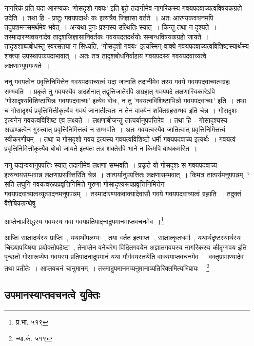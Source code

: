 		नागरिकं प्रति यदा आरण्यकः 'गोसदृशो गवयः' इति ब्रूते तदानीमेव नागरिकस्य गवयपदवाच्यत्वविषयकग्रहो उदेति~। तथा हि~- प्रष्टुः गवयपदार्थः कः इत्यत्रैव जिज्ञासा वर्तते~। अतः आरण्यकवचनमपि तदुपशमनसमर्थमेव भवेत्~। अन्यथा पुनः प्रश्नस्य उत्थितिः स्यात्~। किन्तु तथा न दृश्यते~। तस्मादारण्यवचनादेव तादृशजिज्ञासानिवर्तकः गवयपदतदर्थयोः सम्बन्धविषयकग्रहो जायते~। तादृशशाब्दबोधस्तु स्वरसतया न सिध्यति, 'गोसदृशो गवयः' इत्यस्मिन् वाक्ये गवयपदवाच्यत्वविशिष्टस्यार्थस्य शक्त्या उपस्थापकपदाभावात्~। अतः तत्र तादृशबोधनिर्वाहाय गवयपदस्य गवयपदवाच्यत्वे लक्षणाभ्युपगम्यते~। 

		ननु गवयत्वेन प्रवृत्तिनिमित्तेन गवयपदवाच्यत्वं यदा जानाति तदानीमेव तस्य गवये गवयपदवाच्यत्वग्रहः सम्भवति~। प्रकृते तु गवयस्यैव अदर्शनात् तद्वृत्तिजातेरपि अग्रहात् गवयपदे लक्षणास्विकारेऽपि 'गोसादृश्यविशिष्टाभिन्नः गवयपदवाच्यः' इत्येव बोधः, न तु 'गवयत्वविशिष्टाभिन्नो गवयपदवाच्यः' इति~। तथा च गोसादृश्यं प्रवृत्तिमित्तीकृत्यैव गवयं जानातीत्यतः न तेन वाक्येन शक्तिग्रहसम्भव इति चेन्न~।  गोसदृशः इत्यनेन गवयत्वविशिष्ट एव लक्ष्यते~। लक्षणाबीजन्तु तात्पर्यानुपपत्तिरेव~। तथा हि~- गोसादृश्यस्य अखण्डत्वेन गुरुत्वात् प्रवृत्तिनिमित्तत्वं न सम्भवति~। अतः गवयत्वस्यैव जातित्वात् प्रवृत्तिनिमित्तत्वं स्वीकरणीयम्~। तथा च गोसदृशो गवय इत्यस्य गवयत्वविशिष्टो धर्मी गवयपदवाच्य इत्यर्थः~। गवयत्वं प्रवृत्तिनिमित्तीकृत्यैव बोधो जायते इत्यतः तत्र शक्तेरपि भाने न किमपि बाधकमस्ति~। 

		ननु यद्यन्वयानुपपत्तिः स्यात् तदानीमेव लक्षणा सम्भवति~। प्रकृते यो गोसदृशः स गवयपदवाच्य इत्यन्वयसम्भवान्न लक्षणाप्रसक्तिरिति चेन्न~। तात्पर्यानुपपत्तितः लक्षणासम्भवात्~।  किमत्र तात्पर्यमनुपपन्नम्~? सति लघुनि गवयत्वरूपप्रवृत्तिनिमित्ते गुरुणा गोसादृश्यरूपप्रवृत्तिनिमित्तेन गवयपदवाच्यत्वव्युत्पादनमनुपपन्नम्~। तस्मादारण्यकवाक्यादेवासौ गवये गवयपदवाच्यत्वं ग्रह्णाति~। तदुक्तं वैशेषिकग्रन्थेषु~-

		{\fontsize{11.7}{0}\selectfont\s  आप्तेनाप्रसिद्धस्य गवयस्य गवा गवयप्रतिपादनादुपमानमाप्तवचनमेव~।\footnote{प्र.भा. ५१९}}

		{\fontsize{11.7}{0}\selectfont\s  आप्तिः साक्षादर्थस्य प्राप्तिः~, यथार्थोपलम्भः~, तया वर्तत इत्याप्तः~, साक्षात्कृतधर्मा~, यथार्थदृष्टस्यार्थस्य चिख्यापयिषया प्रयोक्तोपदेष्टा~, तेनाप्तेन वनेचरेण विदितगवयेन अज्ञातगवयस्य नागरिकस्य कीदृग्गवय इति पृच्छतो गोसारूप्येण गवयस्य प्रतिपादनादुपमानं यथा गौर्गवयस्तथेति वाक्यमाप्तवचनमेव~। वक्तृप्रामाण्यादेव तथा प्रतीतेः~। आप्तवचनं चानुमानम्~। तस्मादुपमानमप्यनुमानाव्यतिरिक्तमित्यभिप्रायः~।\footnote{न्या.कं. ५१९}}

		\subsection{उपमानस्याप्तवचनत्वे युक्तिः}

